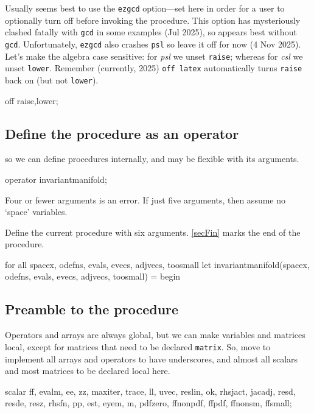 \documentclass[11pt,a5paper]{article}
\begin{document}
Usually seems best to use the \verb|ezgcd| option---set here
in order for a user to optionally turn off before invoking
the procedure.  This option has mysteriously clashed fatally
with \verb|gcd| in some examples (Jul 2025), so appears best
without \verb|gcd|.  Unfortunately, \verb|ezgcd| also crashes \verb|psl| so leave it off for now (4 Nov 2025).
Let's make the algebra case sensitive: for \emph{psl} we unset \verb|raise|; whereas for \emph{csl} we unset \verb|lower|.  
Remember (currently, 2025) \verb|off latex| automatically turns \verb|raise| back on (but not \verb|lower|).
\begin{reduce}
off raise,lower;
\end{reduce}



\subsection{Define the procedure as an operator} so we can define
procedures internally, and may be flexible with its
arguments. 
\begin{reduce}
operator invariantmanifold;
\end{reduce}
Four or fewer arguments is an error.
If just five arguments, then assume no `space' variables.

Define the current procedure with six arguments. 
\eqref{secFin} marks the end of the procedure.
\begin{reduce}
for all spacex, odefns, evals, evecs, adjvecs, toosmall 
    let invariantmanifold(spacex, odefns, evals, evecs, 
        adjvecs, toosmall) = begin 
\end{reduce}


\subsection{Preamble to the procedure}
Operators and arrays are always global, but we can make
variables and matrices local, except for matrices that need
to be declared \verb|matrix|.  So, move to implement all
arrays and operators to have underscores, and almost all
scalars and most matrices to be declared local here.
\begin{reduce}
scalar ff, evalm, ee, zz, maxiter, trace, ll, uvec,
reslin, ok, rhsjact, jacadj, resd, resde, resz, rhsfn,
pp, est, eyem, m, pdfzero, ffnonpdf, ffpdf, ffnonsm,
ffsmall;
\end{reduce}
\end{document}
